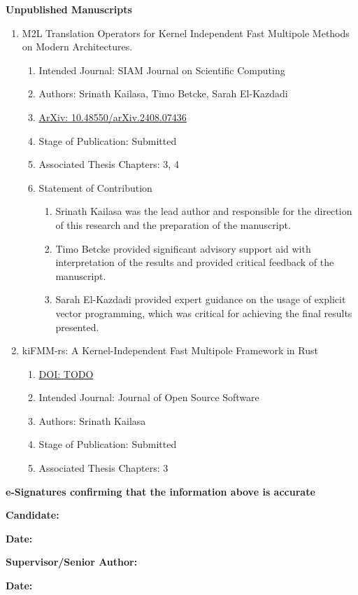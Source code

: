 \textbf{Unpublished Manuscripts}

\begin{enumerate}
    \item M2L Translation Operators for Kernel Independent Fast Multipole Methods on Modern Architectures.
    \begin{enumerate}[label=\alph*)]
      \item Intended Journal: SIAM Journal on Scientific Computing
      \item Authors: Srinath Kailasa, Timo Betcke, Sarah El-Kazdadi
      \item  \href{https://doi.org/10.48550/arXiv.2408.07436}{ArXiv: 10.48550/arXiv.2408.07436}
      \item Stage of Publication: Submitted
      \item Associated Thesis Chapters: 3, 4
      \item Statement of Contribution
      \begin{enumerate}
        \item Srinath Kailasa was the lead author and responsible for the direction of this research and the preparation of the manuscript.
        \item Timo Betcke provided significant advisory support aid with interpretation of the results and provided critical feedback of the manuscript.
        \item Sarah El-Kazdadi provided expert guidance on the usage of explicit vector programming, which was critical for achieving the final results presented.
      \end{enumerate}
    \end{enumerate}

    \item kiFMM-rs: A Kernel-Independent Fast Multipole Framework in Rust
    \begin{enumerate}[label=\alph*)]
      \item \href{https://ieeexplore.ieee.org/document/10124108}{DOI: TODO}
      \item Intended Journal: Journal of Open Source Software
      \item Authors: Srinath Kailasa
      \item Stage of Publication: Submitted
      \item Associated Thesis Chapters: 3
    \end{enumerate}

\end{enumerate}

\textbf{e-Signatures confirming that the information above is accurate}

\hspace*{10mm}

\textbf{Candidate:}

\textbf{Date:}

\hspace*{10mm}

\textbf{Supervisor/Senior Author:}

\textbf{Date:}